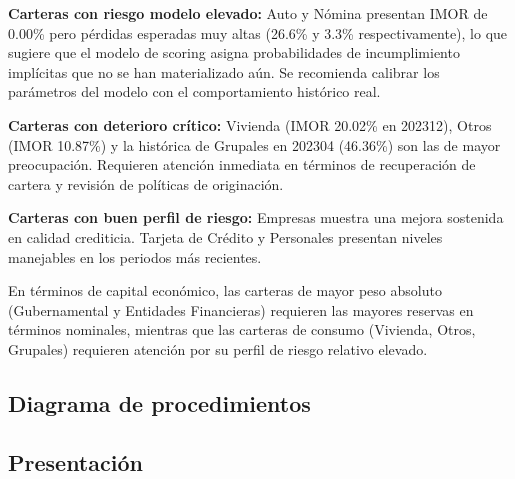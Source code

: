 \textbf{Carteras con riesgo modelo elevado:} Auto y Nómina presentan IMOR de 0.00\% pero pérdidas esperadas muy altas (26.6\% y 3.3\% respectivamente), lo que sugiere que el modelo de scoring asigna probabilidades de incumplimiento implícitas que no se han materializado aún. Se recomienda calibrar los parámetros del modelo con el comportamiento histórico real.

\textbf{Carteras con deterioro crítico:} Vivienda (IMOR 20.02\% en 202312), Otros (IMOR 10.87\%) y la histórica de Grupales en 202304 (46.36\%) son las de mayor preocupación. Requieren atención inmediata en términos de recuperación de cartera y revisión de políticas de originación.

\textbf{Carteras con buen perfil de riesgo:} Empresas muestra una mejora sostenida en calidad crediticia. Tarjeta de Crédito y Personales presentan niveles manejables en los periodos más recientes.

En términos de capital económico, las carteras de mayor peso absoluto (Gubernamental y Entidades Financieras) requieren las mayores reservas en términos nominales, mientras que las carteras de consumo (Vivienda, Otros, Grupales) requieren atención por su perfil de riesgo relativo elevado.

\subsection{Diagrama de procedimientos}

\subsection{Presentación}